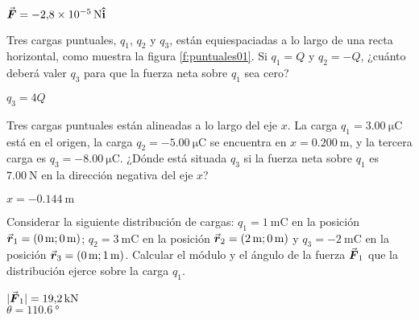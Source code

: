 \begin{Answer}
  $\va*{F} = \SI{-2.8E-5}{\newton}\vu{i}$
\end{Answer}
%
\begin{Exercise}\label{p:puntuales01}
  Tres cargas puntuales, $q_1$, $q_2$ y $q_3$, están equiespaciadas a lo largo de una recta horizontal, como muestra la figura \ref{f:puntuales01}. Si $q_1 = Q$ y $q_2 = -Q$, ¿cuánto deberá valer $q_3$ para que la fuerza neta sobre $q_1$ sea cero?
\end{Exercise}
\begin{Answer}
  $q_3 = 4Q$
\end{Answer}
%
\begin{center}
\end{center}
%
\begin{Exercise}
  Tres cargas puntuales están alineadas a lo largo del eje $x$. La carga $q_1 = \SI{3.00}{\micro\coulomb}$ está en el origen, la carga $q_2 = \SI{-5.00}{\micro\coulomb}$ se encuentra en $x = \SI{0.200}{\metre}$, y la tercera carga es $q_3 = \SI{-8.00}{\micro\coulomb}$. ¿Dónde está situada $q_3$ si la fuerza neta sobre $q_1$ es $\SI{7.00}{\newton}$ en la dirección negativa del eje $x$?
\end{Exercise}
\begin{Answer}
  $x = \SI{-0.144}{\metre}$
\end{Answer}
%
\begin{Exercise}
  Considerar la siguiente distribución de cargas: $q_1 = \SI{1}{\milli\coulomb}$ en la posición $\va*{r}_1 = (\SI{0}{\metre};\SI{0}{\metre})$; $q_2 = \SI{3}{\milli\coulomb}$ en la posición $\va*{r}_2 = (\SI{2}{\metre};\SI{0}{\metre})$ y $q_3 = \SI{-2}{\milli\coulomb}$ en la posición $\va*{r}_3 = (\SI{0}{\metre};\SI{1}{\metre})$. Calcular el módulo y el ángulo de la fuerza $\va*{F}_1$ que la distribución ejerce sobre la carga $q_1$.
\end{Exercise}
\begin{Answer}
  \begin{minipage}[t]{.5\textwidth}
    $|\va*{F}_1| = \SI{19.2}{\kilo\newton}$\\ $\theta = \SI{110.6}{\degree}$
  \end{minipage}
\end{Answer}
